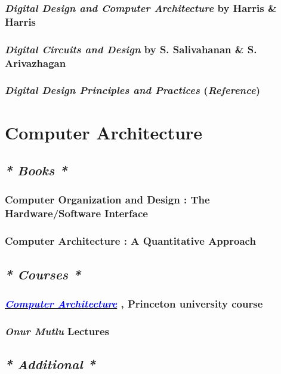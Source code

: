 \documentclass[12pt, a4paper]{article}
\begin{document}
\subsubsection*{\emph{Digital Design and Computer Architecture} by Harris \& Harris }
\subsubsection*{\emph{Digital Circuits and Design} by S. Salivahanan \& S. Arivazhagan}
\subsubsection*{\textit{Digital Design Principles and Practices} (\emph{Reference})}


\section{Computer Architecture}
\subsection*{\emph{* Books *}}
\subsubsection*{\small{Computer Organization and Design : The Hardware/Software Interface}}
\subsubsection*{Computer Architecture : A Quantitative Approach}
\subsection*{\emph{* Courses *}}
\subsubsection*{\href{https://www.coursera.org/learn/comparch}{\emph{\textcolor{blue}{Computer Architecture}}} , Princeton university course}
\subsubsection*{\emph{Onur Mutlu} Lectures}
\newpage
\subsection*{\emph{* Additional *}}
\subsubsection*{}
\end{document}
